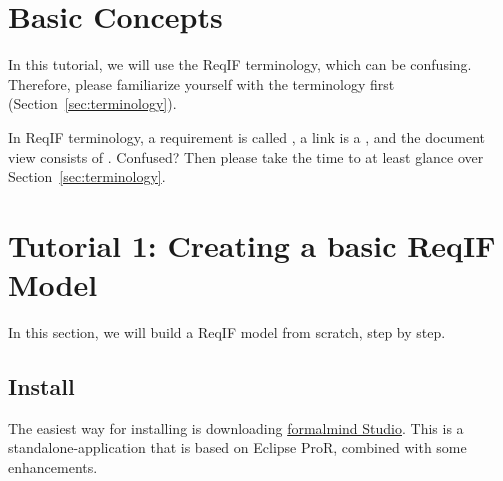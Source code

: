% 

\section{Basic Concepts}

In this tutorial, we will use the ReqIF terminology, which can be confusing.  Therefore, please familiarize yourself with the terminology first (Section~\ref{sec:terminology}).

\begin{warning}
In ReqIF terminology, a requirement is called , a link is a , and the document view consists of .  Confused? Then please take the time to at least glance over Section~\ref{sec:terminology}.
\end{warning}

\section{Tutorial 1: Creating a basic ReqIF Model}

In this section, we will build a ReqIF model from scratch, step by step.

\subsection{Install \pror{}}

The easiest way for installing \pror{} is downloading \href{http://formalmind.com/studio}{formalmind Stu\-dio}.  This is a standalone-application that is based on Eclipse ProR, combined with some enhancements.

